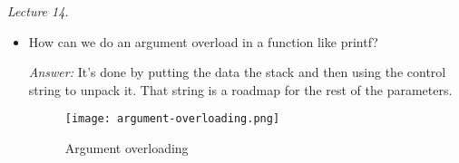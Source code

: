\textit{Lecture 14.}
\begin{itemize}
    \item How can we do an argument overload in a function like printf?

    \textit{Answer:}
    It's done by putting the data the stack and then using the control string
        to unpack it. That string is a roadmap for the rest of the parameters.
    \begin{figure}[h]
        \centering
        \texttt{[image: argument-overloading.png]}
        \caption{Argument overloading}%
        \label{fig:arg_overloading}
    \end{figure}
\end{itemize}


